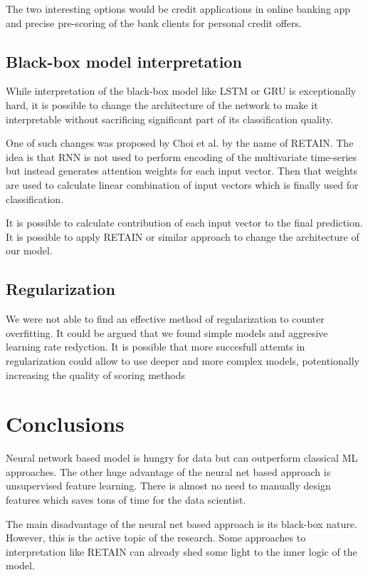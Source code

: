 \documentclass[sigconf]{acmart}
\begin{document}
The two interesting options would be credit applications in online banking app and precise pre-scoring of the bank clients for personal credit offers. 

\subsection{Black-box model interpretation}

While interpretation of the black-box model like LSTM or GRU is exceptionally hard, it is possible to change the architecture of the network to make it interpretable without sacrificing significant part of its classification quality.

One of such changes was proposed by Choi et al.\cite{DBLP:journals/corr/ChoiBSSS16} by the name of RETAIN. The idea is that RNN is not used to perform encoding of the multivariate time-series but instead generates attention weights for each input vector. Then that weights are used to calculate linear combination of input vectors which is finally used for classification.

It is possible to calculate contribution of each input vector to the final prediction. It is possible to apply RETAIN or similar approach to change the architecture of our model.

\subsection{Regularization}

We were not able to find an effective method of regularization to counter overfitting. It could be argued that we found simple models  and aggresive learning rate redyction. It is possible that more succesfull attemts in regularization could allow to use deeper and more complex models, potentionally increasing the quality of scoring methods


\section{Conclusions}

Neural network based model is hungry for data but can outperform classical ML approaches. The other huge advantage of the neural net based approach is unsupervised feature learning. There is almost no need to manually design features which saves tons of time for the data scientist.

The main disadvantage of the neural net based approach is its black-box nature. However, this is the active topic of the research. Some approaches to interpretation like RETAIN can already shed some light to the inner logic of the model.
\end{document}
